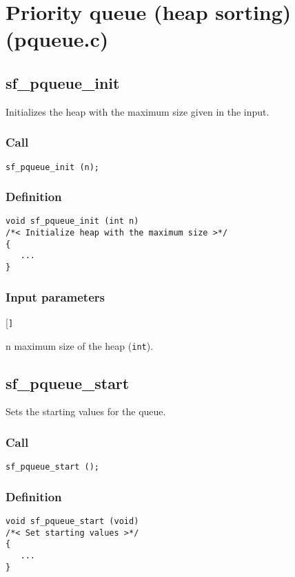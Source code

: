 \section{Priority queue (heap sorting) (pqueue.c)}




\subsection{{sf\_pqueue\_init}}
Initializes the heap with the maximum size given in the input.

\subsubsection*{Call}
\begin{verbatim}sf_pqueue_init (n);\end{verbatim}

\subsubsection*{Definition}
\begin{verbatim}
void sf_pqueue_init (int n)
/*< Initialize heap with the maximum size >*/
{
   ...
}
\end{verbatim}

\subsubsection*{Input parameters}
\begin{desclist}{\tt }{\quad}[\tt ]
   \setlength\itemsep{0pt}
   \item[n] maximum size of the heap (\texttt{int}).  
\end{desclist}




\subsection{{sf\_pqueue\_start}}
Sets the starting values for the queue.

\subsubsection*{Call}
\begin{verbatim}sf_pqueue_start ();\end{verbatim}

\subsubsection*{Definition}
\begin{verbatim}
void sf_pqueue_start (void)
/*< Set starting values >*/
{
   ...
}
\end{verbatim}




